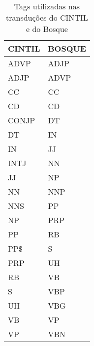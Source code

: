 \begin{table}[!h]
    \centering
    \begin{tabular}{|l|l|}
        \hline
        CINTIL  &   BOSQUE\\
        \hline
        ADVP    &   ADJP\\
        ADJP    &   ADVP\\
        CC    & CC\\
        CD    &  CD\\
        CONJP    & DT\\
        DT    & IN\\
        IN    & JJ\\
        INTJ    &   NN\\
        JJ    & NP\\
        NN    & NNP\\
        NNS    &    PP\\
        NP    & PRP\\
        PP    & RB\\
        PP\$    &    S\\
        PRP    &   UH\\
        RB    & VB\\
        S    &  VBP\\
        UH    & VBG\\
        VB    & VP\\
        VP    & VBN\\
        \hline
    \end{tabular}
    \caption[Tags utilizadas nas transduções do CINTIL e do Bosque]{Tags utilizadas nas transduções do CINTIL e do Bosque}
    \label{tab:comp_cintil_bosque}
\end{table}